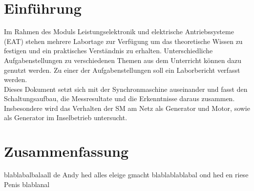 

\section*{Einführung}

Im Rahmen des Moduls Leistungselektronik und elektrische Antriebssysteme (EAT) stehen mehrere Labortage zur Verfügung um das theoretische Wissen zu festigen und ein praktisches Verständnis zu erhalten. 
Unterschiedliche Aufgabenstellungen zu verschiedenen Themen aus dem Unterricht können dazu genutzt werden.
Zu einer der Aufgabenstellungen soll ein Laborbericht verfasst werden.\\

Dieses Dokument setzt sich mit der Synchronmaschine auseinander und fasst den Schaltungsaufbau, die Messresultate und die Erkenntnisse daraus zusammen.\\
Insbesondere wird das Verhalten der SM am Netz als Generator und Motor, sowie als Generator im Inselbetrieb untersucht.




\section*{Zusammenfassung}

blablabalbalaall de Andy hed alles eleige gmacht blablablablabal ond hed en riese Penis blablanal